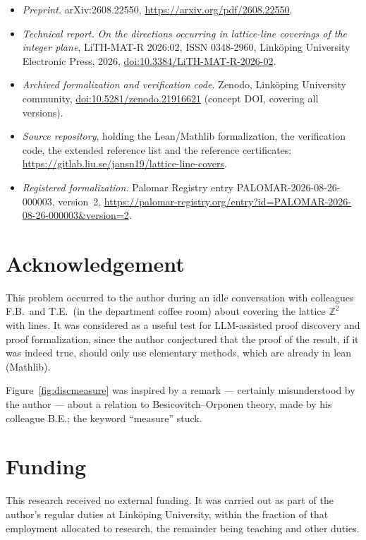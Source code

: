 \documentclass[a4paper,11pt,oneside,reqno]{amsart}
\newcommand{\doi}[1]{\href{https://doi.org/#1}{doi:#1}}
\theoremstyle{definition}
\theoremstyle{remark}
\theoremstyle{plain}
\newcommand{\Z}{\mathbb{Z}}
\begin{document}
\begin{itemize}
\item \emph{Preprint.} arXiv:2608.22550,
  \url{https://arxiv.org/pdf/2608.22550}.
\item \emph{Technical report.} \emph{On the directions occurring in lattice-line coverings of the
  integer plane}, LiTH-MAT-R 2026:02, ISSN 0348-2960, Link\"oping University Electronic Press,
  2026, \doi{10.3384/LiTH-MAT-R-2026-02}.
\item \emph{Archived formalization and verification code.} Zenodo, Link\"oping University
  community, \doi{10.5281/zenodo.21916621} (concept DOI, covering all versions).
\item \emph{Source repository}, holding the Lean/Mathlib formalization, the verification code, the
  extended reference list and the reference certificates:
  \url{https://gitlab.liu.se/jansn19/lattice-line-covers}.
\item \emph{Registered formalization.} Palomar Registry entry PALOMAR-2026-08-26-000003,
  version~2,
  \url{https://palomar-registry.org/entry?id=PALOMAR-2026-08-26-000003&version=2}.
\end{itemize}

\section*{Acknowledgement}

This problem occurred to the author during an idle conversation with colleagues
F.B.\ and T.E.\ (in the department coffee room) about covering the lattice \(\Z^2\) with lines.
It was considered as a useful test for LLM-assisted proof discovery and proof
formalization, since the author conjectured that the proof of the result,
if it was indeed true, should only use elementary methods, which are already in
lean (Mathlib).

Figure~\ref{fig:discmeasure} was inspired by a remark --- certainly misunderstood by the author ---
about a relation to Besicovitch--Orponen theory, made by his colleague B.E.; the keyword
``measure'' stuck.

\section*{Funding}

This research received no external funding. It was carried out as part of the author's regular
duties at Link\"oping University, within the fraction of that employment allocated to research, the
remainder being teaching and other duties.
\end{document}
